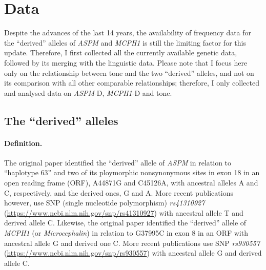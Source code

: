 \documentclass[twoside,onecolumn]{article}
\begin{document}

\section{Data}

Despite the advances of the last 14 years, the availability of frequency data for the ``derived'' alleles of \textit{ASPM} and \textit{MCPH1} is still the limiting factor for this update.
Therefore, I first collected all the currently available genetic data, followed by its merging with the linguistic data.
Please note that I focus here only on the relationship between tone and the two ``derived'' alleles, and not on its comparison with all other comparable relationships; therefore, I only collected and analysed data on \textit{ASPM}-D, \textit{MCPH1}-D and tone.

\subsection{The ``derived'' alleles}

\paragraph{Definition.}
The original \citet[p. 1720]{mekelbobrov_aspm_2005} paper identified the ``derived'' allele of \textit{ASPM} in relation to ``haplotype 63'' and two of its ploymorphic nonsynonymous sites in exon 18 in an open reading frame (ORF), A44871G and C45126A, with ancestral alleles A and C, respectively, and the derived ones, G and A.
More recent publications however, use SNP (single nucleotide polymorphism) \textit{rs41310927} (\url{https://www.ncbi.nlm.nih.gov/snp/rs41310927}) with ancestral allele T and derived allele C.
Likewise, the original \citet[p. 1717]{evans_microcephalin_2005} paper identified the ``derived'' allele of \textit{MCPH1} (or \textit{Microcephalin}) in relation to G37995C in exon 8 in an ORF with ancestral allele G and derived one C.
More recent publications use SNP \textit{rs930557} (\url{https://www.ncbi.nlm.nih.gov/snp/rs930557}) with ancestral allele G and derived allele C.
\end{document}
